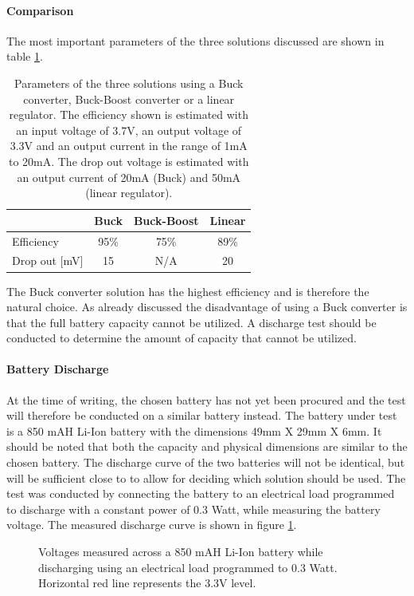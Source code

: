 \paragraph{Comparison}
The most important parameters of the three solutions discussed are shown in table \ref{tab:vol_gen_joint}.

\begin{table}[h]
	\centering
	\begin{tabular}{l|c|c|c}
		  				&	Buck 	& Buck-Boost 	& Linear\\
		 \hline
		 Efficiency  	&  95\% 	& 75\%			&89\%		\\
		 Drop out [mV]		&15  	& N/A		&20		\\
	\end{tabular}
	\caption[Parameters of voltage generation solutions.]{Parameters of the three solutions using a Buck converter, Buck-Boost converter or a linear regulator. The efficiency shown is estimated with an input voltage of 3.7V, an output voltage of 3.3V and an output current in the range of 1mA to 20mA. The drop out voltage is estimated with an output current of 20mA (Buck) and 50mA (linear regulator).}
	\label{tab:vol_gen_joint}
\end{table}

The Buck converter solution has the highest efficiency and is therefore the natural choice.
As already discussed the disadvantage of using a Buck converter is that the full battery capacity cannot be utilized.
A discharge test should be conducted to determine the amount of capacity that cannot be utilized.


\paragraph{Battery Discharge}
At the time of writing, the chosen battery has not yet been procured and the test will therefore be conducted on a similar battery instead.
The battery under test is a 850 mAH Li-Ion battery with the dimensions 49mm X 29mm X 6mm.
It should be noted that both the capacity and physical dimensions are similar to the chosen battery.
The discharge curve of the two batteries will not be identical, but will be sufficient close to to allow for deciding which solution should be used.
The test was conducted by connecting the battery to an electrical load programmed to discharge with a constant power of 0.3 Watt, while measuring the battery voltage.
The measured discharge curve is shown in figure \ref{fig:bat_discharge}.

\begin{figure}[h]
	\centering
	
	\caption[Discharge curve of Li-Ion battery.]{Voltages measured across a 850 mAH Li-Ion battery while discharging using an electrical load programmed to 0.3 Watt. Horizontal red line represents the 3.3V level.}
	\label{fig:bat_discharge}
\end{figure}

